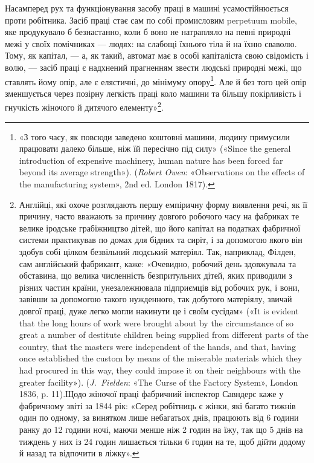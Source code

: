 Насамперед рух та функціонування засобу праці в машині
усамостійнюється проти робітника. Засіб праці стає сам по собі
промисловим perpetuum mobile, яке продукувало б безнастанно,
коли б воно не натрапляло на певні природні межі у своїх помічниках
— людях: на слабощі їхнього тіла й на їхню сваволю.
Тому, як капітал, — а, як такий, автомат має в особі капіталіста
свою свідомість і волю, — засіб праці є надхнений прагненням
звести людські природні межі, що ставлять йому опір, але є елястичні,
до мінімуму опору\footnote{
«З того часу, як повсюди заведено коштовні машини, людину
примусили працювати далеко більше, ніж їй пересічно під силу» («Sіnce
the general introduction of expensive machinery, human nature has been
forced far beyond its average strength»). (\emph{Robert Owen}: «Observations
on the effects of the manufacturing system», 2nd ed. London 1817).
}. Але й без того цей опір зменшується
через позірну легкість праці коло машини та більшу покірливість
і гнучкість жіночого й дитячого елементу»\footnote{
Англійці, які охоче розглядають першу емпіричну форму виявлення
речі, як її причину, часто вважають за причину довгого робочого
часу на фабриках те велике іродське грабіжництво дітей, що його капітал
на податках фабричної системи практикував по домах для бідних та
сиріт, і за допомогою якого він здобув собі цілком безвільний людський
матеріял. Так, наприклад, Філден, сам англійський фабрикант, каже:
«Очевидно, робочий день здовжувала та обставина, що велика численність
безпритульних дітей, яких приводили з різних частин країни, унезалежнювала
підприємців від робочих рук, і вони, завівши за допомогою такого
нужденного, так добутого матеріялу, звичай довгої праці, дуже легко
могли накинути це і своїм сусідам» («It is evident that the long hours of
work were brought about by the circumstance of so great a number of destitute
children being supplied from different parts of the country, that the
masters were independent of the hands, and that, having once established
the custom by means of the miserable materials which they had procured in
this way, they could impose it on their neighbours with the greater facility»).
(\emph{J.~Fielden}: «The Curse of the Factory System», London 1836, p. 11).Щодо жіночої
праці фабричний інспектор Савндерс каже у фабричному
звіті за 1844 рік: «Серед робітниць є жінки, які багато тижнів один по
одному, за винятком лише небагатьох днів, працюють від 6 години ранку
до 12 години ночі, маючи менше ніж 2 годин на їжу, так що 5 днів на тиждень
у них із 24 годин лишається тільки 6 годин на те, щоб дійти додому
й назад та відпочити в ліжку».}.

